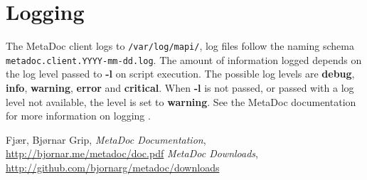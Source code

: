 \documentclass[titlepage, a4paper,10pt]{article}
\begin{document}
\section{Logging}
The MetaDoc client logs to \texttt{/var/log/mapi/}, log files follow the naming
schema \texttt{metadoc.client.YYYY-mm-dd.log}. The amount of information logged
depends on the log level passed to \textbf{-l} on script execution. The
possible log levels are \textbf{debug}, \textbf{info}, \textbf{warning},
\textbf{error} and \textbf{critical}. When \textbf{-l} is not passed, or passed
with a log level not available, the level is set to \textbf{warning}. See the
MetaDoc documentation for more information on logging \cite{mdoc}.

\newpage
\begin{thebibliography}{99}
     Fjær, Bjørnar Grip, \textit{MetaDoc Documentation},
        \url{http://bjornar.me/metadoc/doc.pdf}
     \textit{MetaDoc Downloads},
        \url{http://github.com/bjornarg/metadoc/downloads}
\end{thebibliography}
\end{document}
